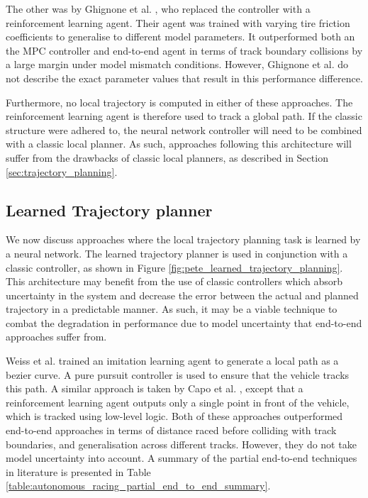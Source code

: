 The other was by Ghignone et al. \cite{Ghignone2022}, who replaced the controller with a reinforcement learning agent.
Their agent was trained with varying tire friction coefficients to generalise to different model parameters.
It outperformed both an the MPC controller and end-to-end agent in terms of track boundary collisions by a large margin under model mismatch conditions.
However, Ghignone et al. \cite{Ghignone2022} do not describe the exact parameter values that result in this performance difference.

Furthermore, no local trajectory is computed in either of these approaches. The reinforcement learning agent is therefore used to track a global path.
If the classic structure were adhered to, the neural network controller will need to be combined with a classic local planner. 
As such, approaches following this architecture will suffer from the drawbacks of classic local planners, as described in Section \ref{sec:trajectory_planning}.


\subsection{Learned Trajectory planner}
\label{sec:learned_planner}
We now discuss approaches where the local trajectory planning task is learned by a neural network.
The learned trajectory planner is used in conjunction with a classic controller, as shown in Figure \ref{fig:pete_learned_trajectory_planning}. 
This architecture may benefit from the use of classic controllers which absorb uncertainty in the system and decrease the error between the actual and planned trajectory in a predictable manner.
As such, it may be a viable technique to combat the degradation in performance due to model uncertainty that end-to-end approaches suffer from. 

Weiss et al. \cite{Weiss2020a} trained an imitation learning agent to generate a local path as a bezier curve.
A pure pursuit controller is used to ensure that the vehicle tracks this path.
A similar approach is taken by Capo et al. \cite{Capo2020}, except that a reinforcement learning agent outputs only a single point in front of the vehicle, which is tracked using low-level logic.
Both of these approaches outperformed end-to-end approaches in terms of distance raced before colliding with track boundaries, and generalisation across different tracks. However, they do not take model uncertainty into account.
A summary of the partial end-to-end techniques in literature is presented in Table \ref{table:autonomous_racing_partial_end_to_end_summary}.


